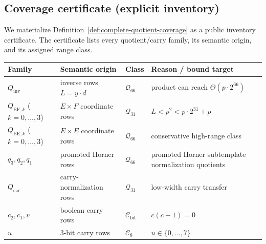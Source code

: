 ﻿\documentclass[11pt]{article}
\newcommand{\Cset}{\mathcal{C}}
\begin{document}
\subsection{Coverage certificate (explicit inventory)}

We materialize Definition~\ref{def:complete-quotient-coverage} as a public
inventory certificate. The certificate lists every quotient/carry family,
its semantic origin, and its assigned range class.

\begin{center}
\begin{tabular}{|l|l|l|l|}
\hline
Family & Semantic origin & Class & Reason / bound target \\
\hline
\(Q_{\mathrm{inv}}\) & inverse rows \(L=y\cdot d\) & \(\mathcal Q_{66}\) & product can reach \(\Theta(p\cdot 2^{66})\) \\
\hline
\(Q_{\mathrm{EF},k}\) (\(k=0,\dots,3\)) & \(E\times F\) coordinate rows & \(\mathcal Q_{31}\) & \(L< p^2 < p\cdot 2^{31}+p\) \\
\hline
\(Q_{\mathrm{EE},k}\) (\(k=0,\dots,3\)) & \(E\times E\) coordinate rows & \(\mathcal Q_{66}\) & conservative high-range class \\
\hline
\(q_3,q_2,q_1\) & promoted Horner rows & \(\mathcal Q_{66}\) & promoted Horner subtemplate normalization quotients \\
\hline
\(Q_{\mathrm{car}}\) & carry-normalization rows & \(\mathcal Q_{31}\) & low-width carry transfer \\
\hline
\(c_2,c_1,v\) & boolean carry rows & \(\Cset_{\mathrm{bit}}\) & \(c(c-1)=0\) \\
\hline
\(u\) & 3-bit carry rows & \(\Cset_8\) & \(u\in\{0,\dots,7\}\) \\
\hline
\end{tabular}
\end{center}
\end{document}

